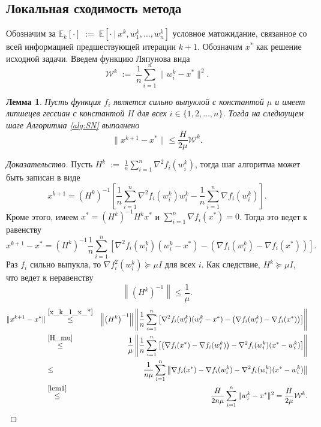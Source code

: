 \documentclass[a4paper, 12pt]{article}
\newcommand{\eqdef}{\; { := }\;}
\newcommand{\Exp}{\mathbb{E}}
\newcommand{\cW}{{\mathcal{W}}}
\newtheorem{lem1}{Лемма}
\begin{document}
	\subsection{Локальная сходимость метода}
	\noindent Обозначим за $\Exp_k[\cdot] \eqdef \Exp[\cdot~|~x^k, w_1^k, \dots, w_n^k]$ условное матожидание, связанное со всей информацией предшествующей итерации $k+1$. Обозначим $x^*$ как решение исходной задачи. Введем функцию Ляпунова вида 
	$$\cW^k \eqdef \frac{1}{n}\sum\limits_{i=1}^n\|w_i^k-x^*\|^2.$$
	
	\begin{lem1}
	\label{lem2}
		Пусть функция $f_i$ является сильно выпуклой с константой $\mu$ и имеет липшецев гессиан с константой $H$ для всех $i \in \{1,2,\dots,n\}$. Тогда на следюущем шаге Алгоритма \ref{alg:SN} выполнено
		\begin{equation}
		\|x^{k+1}-x^*\|	\leq \frac{H}{2\mu}\cW^k.
		\end{equation}
	\end{lem1}
	\begin{proof}[Доказательство]
		Пусть $H^k \eqdef \frac{1}{n}\sum_{i=1}^n\nabla^2 f_i(w_i^k)$, тогда шаг алгоритма может быть записан в виде
		$$x^{k+1} = \left(H^k\right)^{-1}\left[\frac{1}{n}\sum\limits_{i=1}^n\nabla^2 f_i(w_i^k)w_i^k-\frac{1}{n}\sum\limits_{i=1}^n\nabla f_i(w_i^k)\right].$$
		Кроме этого, имеем $x^* = \left(H^k\right)^{-1}H^kx^*$ и $\sum_{i=1}^n\nabla f_i(x^*) = 0$. Тогда это ведет к равенству
		\begin{equation}
		\label{x_k_1_x_*} 
			x^{k+1} - x^* = \left(H^k\right)^{-1}\frac{1}{n}\sum\limits_{i=1}^n\left[\nabla^2f_i(w_i^k)(w_i^k-x^*)-\left(\nabla f_i(w_i^k)-\nabla f_i(x^*)\right)\right].
		\end{equation}
		Раз $f_i$ сильно выпукла, то $\nabla f_i^2(w_i^k) \succeq \mu I$ для всех $i$. Как следствие, $H^k \succeq \mu I$, что ведет к неравенству
		\begin{equation}
		\label{H_mu}
			\left\|\left(H^k\right)^{-1}\right\| \leq \frac{1}{\mu}.
		\end{equation}
		\begin{eqnarray*}
			\|x^{k+1}-x^*\| &\overset{\eqref{x_k_1_x_*}}{\leq}& \left\|\left(H^k\right)^{-1}\right\|\left\|\frac{1}{n}\sum\limits_{i=1}^n\left[\nabla^2 f_i(w_i^k)(w_i^k-x^*)-\left(\nabla f_i(w_i^k) - \nabla f_i(x^*)\right)\right]\right\|\\
			&\overset{\eqref{H_mu}}{\leq}&\frac{1}{\mu}\left\|\frac{1}{n}\sum\limits_{i=1}^n\left[\left(\nabla f_i(x^*)-\nabla f_i(w_i^k)\right)-\nabla^2 f_i(w_i^k)(x^*-w_i^k)\right]\right\|\\
			&\leq& \frac{1}{n\mu}\sum\limits_{i=1}^n\left\|\nabla f_i(x^*)-\nabla f_i(w_i^k)-\nabla^2 f_i(w_i^k)(x^*-w_i^k)\right\|\\
			&\overset{\eqref{lem1}}{\leq}& \frac{H}{2n\mu}\sum\limits_{i=1}^n\|w_i^k-x^*\|^2 = \frac{H}{2\mu}\cW^k.
		\end{eqnarray*}
	\end{proof}
	
\end{document}
